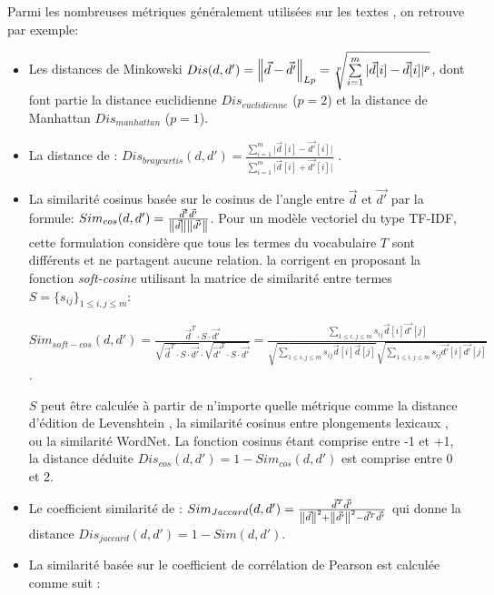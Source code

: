  Parmi les nombreuses métriques généralement utilisées  sur les textes \citep{huang2008similarityTextClustering, vijaymeena2016surveySim, afzali2018Simkmeans}, on retrouve par exemple:
\begin{itemize}
	\item Les distances de Minkowski {\footnotesize $Dis(d,d') = \left\lVert\vec{d} - \vec{d'}\right\rVert_{Lp} = \sqrt[p]{\sum\limits_{i=1}^m \vert \vec{d}[i] - \vec{d}[i] \vert ^p}$}, dont font partie la distance euclidienne $Dis_{euclidienne}$ ($p=2$) et la distance de Manhattan $Dis_{manhattan}$ ($p=1$).
	\item La distance de \citet{bray1957distance-braycurtis}: $Dis_{braycurtis}(d,d') = \frac{\sum\limits_{i=1}^m \vert \vec{d}[i] - \vec{d'}[i] \vert}{\sum\limits_{i=1}^m \vert \vec{d}[i] + \vec{d'}[i] \vert}$ \citep{huang2008similarityTextClustering}.
	\item La similarité cosinus basée sur le cosinus de l'angle entre $\vec{d}$ et $\vec{d'}$ par la formule: $Sim_{cos}(d,d') = \frac{\vec{d}^t\vec{d'}}{\left\lVert\vec{d}\right\rVert\left\lVert\vec{d'}\right\rVert}$.
	Pour un modèle vectoriel du type TF-IDF, cette formulation considère que tous les termes du vocabulaire $T$ sont différents et ne partagent aucune relation. \citet{sidorov2014softcosine} la corrigent en proposant la fonction \textit{soft-cosine} utilisant la matrice de similarité entre  termes $S=\lbrace s_{ij}\rbrace_{1\leq i,j \leq m}$: 
	
	$Sim_{soft-cos}(d,d')= \frac{{\vec{d}}^T\cdot S\cdot \vec{d'}}{\sqrt{{\vec{d}}^T\cdot S\cdot \vec{d'}}\cdot \sqrt{\vec{d'}^T\cdot S\cdot \vec{d'}}} = \frac{\sum\limits_{1\leq i,j \leq m}s_{ij}\vec{d}[i]\vec{d'}[j]}{\sqrt{\sum\limits_{1\leq i,j \leq m}s_{ij}\vec{d}[i]\vec{d}[j]}\sqrt{\sum\limits_{1\leq i,j \leq m}s_{ij}\vec{d'}[i]\vec{d'}[j]}}$.
	
	$S$ peut être calculée à partir de n'importe quelle métrique comme la distance d'édition de Levenshtein \citep{sidorov2014softcosine},  la similarité cosinus entre  plongements lexicaux \citep{charlet2017simbow_acl, charlet2018simbow_coria}, ou la similarité WordNet. La fonction cosinus  étant comprise entre -1 et +1, la distance déduite $Dis_{cos}(d,d') = 1 - Sim_{cos}(d,d')$ est comprise entre 0 et 2.
	
	\item Le coefficient similarité de \cite{jaccard1901similarite-jaccard}: {\footnotesize$Sim_{Jaccard}(d,d') = \frac{\vec{d}^T\vec{d'}}{\left\lVert\vec{d}\right\rVert^2+\left\lVert\vec{d'}\right\rVert^2 - \vec{d}^T\vec{d'}}$} \citep{huang2008similarityTextClustering} qui donne la distance {\footnotesize$Dis_{jaccard}(d,d') = 1-Sim(d,d')$}.
	\item La similarité basée sur le coefficient de corrélation de Pearson est calculée comme suit \citep{huang2008similarityTextClustering}:
	

\end{itemize}
